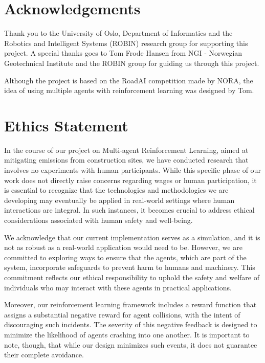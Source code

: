 \documentclass[conference]{IEEEtran}
\begin{document}
\section{Acknowledgements}
Thank you to the University of Oslo, Department of Informatics and the Robotics and
Intelligent Systems (ROBIN) research group for supporting this project. A special thanks goes to
Tom Frode Hansen from NGI - Norwegian Geotechnical Institute and the ROBIN group for guiding us through
this project.

Although the project is based on the RoadAI competition made by NORA, the idea of using multiple
agents with reinforcement learning was designed by Tom.




\section{Ethics Statement}
In the course of our project on Multi-agent Reinforcement Learning, aimed at mitigating \coo{} emissions
from construction sites, we have conducted research that involves no experiments with human participants.
While this specific phase of our work does not directly raise concerns regarding wages or human
participation, it is essential to recognize that the technologies and methodologies we are developing
may eventually be applied in real-world settings where human interactions are integral. In such instances,
it becomes crucial to address ethical considerations associated with human safety and well-being.

We acknowledge that our current implementation serves as a simulation, and it is not as robust as a
real-world application would need to be. However, we are committed to exploring ways to ensure that the
agents, which are part of the system, incorporate safeguards to prevent harm to humans and machinery.
This commitment reflects our ethical responsibility to uphold the safety and welfare of individuals who
may interact with these agents in practical applications.

Moreover, our reinforcement learning framework includes a reward function that assigns a substantial
negative reward for agent collisions, with the intent of discouraging such incidents. The severity of
this negative feedback is designed to minimize the likelihood of agents crashing into one another. It
is important to note, though, that while our design minimizes such events, it does not guarantee their
complete avoidance.
\end{document}
